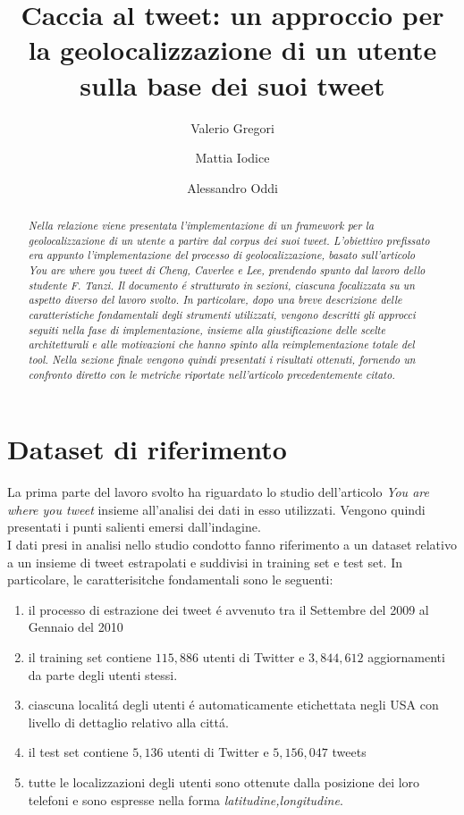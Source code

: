 \documentclass[twocolumn,10pt]{asme2ej}
\title{Caccia al tweet: un approccio per la geolocalizzazione di un utente sulla base dei suoi tweet}
\author{Valerio Gregori
    \affiliation{
    Email: val.gregori2@stud.uniroma3.it
    }	
}
\author{Mattia Iodice
    \affiliation{ 
        Email: mat.iodice1@stud.uniroma3.it
    }
}
\author{Alessandro Oddi
    \affiliation{
        Email: ale.oddi1@stud.uniroma3.it
    }
}
\begin{document}
\maketitle    


\begin{abstract}
{\it Nella relazione  viene presentata l'implementazione di un framework per la geolocalizzazione di un utente a partire dal corpus dei suoi tweet. L'obiettivo prefissato era appunto l'implementazione del processo di geolocalizzazione, basato sull'articolo  \textit{You are where you tweet} di Cheng, Caverlee e Lee, prendendo spunto dal lavoro dello studente F. Tanzi.  Il documento \'e strutturato in sezioni, ciascuna focalizzata su un aspetto diverso del lavoro svolto.  In particolare, dopo una breve descrizione delle caratteristiche fondamentali degli strumenti utilizzati, vengono descritti gli approcci seguiti nella fase di implementazione, insieme alla giustificazione delle scelte architetturali e alle motivazioni che hanno spinto alla reimplementazione totale del tool. Nella sezione finale vengono quindi presentati i risultati ottenuti, fornendo un confronto diretto con le metriche riportate nell'articolo precedentemente citato. }
\end{abstract}


\section{Dataset di riferimento}


La prima parte del lavoro svolto ha riguardato lo studio dell'articolo \textit{You are where you tweet}  insieme all'analisi dei dati in esso utilizzati.
Vengono quindi presentati i punti salienti emersi dall'indagine.\\
I dati presi in analisi nello studio condotto fanno riferimento a un dataset relativo a un insieme di tweet estrapolati e suddivisi in training set e test set. In particolare, le caratterisitche fondamentali sono le seguenti:
\begin{enumerate}

\item  il processo di estrazione dei tweet \'e avvenuto tra il Settembre del 2009 al Gennaio del 2010

\item il training set contiene $115,886$ utenti di Twitter e $3,844,612$ aggiornamenti da parte degli utenti stessi. 

\item ciascuna localit\'a degli utenti \'e automaticamente etichettata negli USA con livello di dettaglio relativo alla citt\'a.

\item il test set contiene $5,136$ utenti di Twitter e $5,156,047$ tweets

\item tutte le localizzazioni degli utenti sono ottenute dalla posizione dei loro telefoni e sono espresse nella forma \textit{latitudine,longitudine}.
\end{enumerate}
\end{document}
